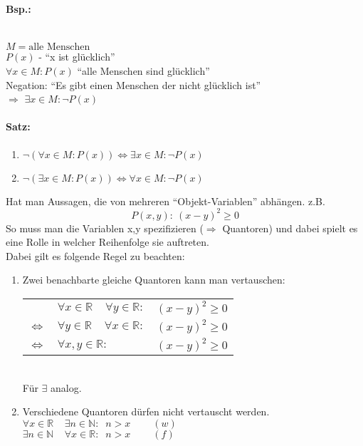 \documentclass[11pt,a4paper,oneside]{article}
\begin{document}
{\paragraph{Bsp.:}\mbox{}\\
  $M = \text{alle Menschen}$\\
  $P(x)$ - ``x ist glücklich''\\
  $\forall x \in M: P(x)$ ``alle Menschen sind glücklich''\\[5pt]
  Negation: ``Es gibt einen Menschen der nicht glücklich ist''\\
  $\Rightarrow$ $\exists x \in M: \neg P(x)$

\paragraph{Satz:}
  \begin{enumerate}
    \item $\neg(\forall x \in M: P(x)) \Leftrightarrow \exists x \in M: \neg P(x)$
    \item $\neg(\exists x \in M: P(x)) \Leftrightarrow \forall x \in M: \neg P(x)$
  \end{enumerate}
  Hat man Aussagen, die von mehreren ``Objekt-Variablen'' abhängen. z.B.
  \[P(x,y):\:(x-y)^2\geq 0\]
  So muss man die Variablen x,y spezifizieren ($\Rightarrow$ Quantoren)
  und dabei spielt es eine Rolle in welcher Reihenfolge sie auftreten.\\[5pt]
  Dabei gilt es folgende Regel zu beachten:

  \begin{enumerate}
    \item Zwei benachbarte gleiche Quantoren kann man vertauschen:\\[3pt]
      \begin{tabular}{clc}
        & $\forall x \in \mathbb{R}\;\;\;\;\forall y \in \mathbb{R}:$ & $(x-y)^2\geq 0$ \\
        $\Leftrightarrow$ & $\forall y \in \mathbb{R}\;\;\;\;\forall x \in \mathbb{R}:$ & $(x-y)^2\geq 0$ \\
        $\Leftrightarrow$ & $\forall x,y \in \mathbb{R}:$ & $(x-y)^2\geq 0$ \\
      \end{tabular}
    \\[3pt]Für $\exists$ analog.
    \item Verschiedene Quantoren dürfen nicht vertauscht werden.\\[3pt]
      $\forall x \in \mathbb{R}\;\;\;\;\exists n \in \mathbb{N}:\;\;n>x\;\;\;\;\;\;\;\;(w)$\\
      $\exists n \in \mathbb{N}\;\;\;\;\forall x \in \mathbb{R}:\;\;n>x\;\;\;\;\;\;\;\;(f)$


\end{enumerate}}
\end{document}
